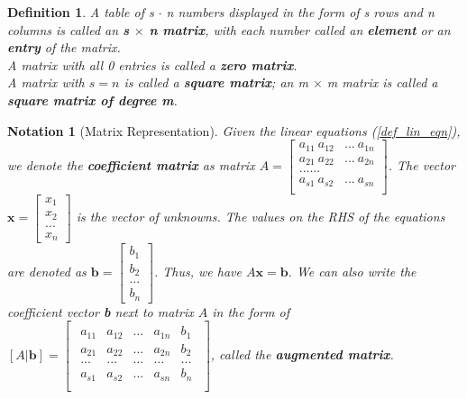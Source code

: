 \documentclass{article}
\newtheorem{definition}{Definition}[section] %
\newtheorem{notation}{Notation}[section] %
\begin{document}
\begin{definition}
    A table of s $\cdot$ n numbers displayed in the form of s rows and n columns is called an \textbf{s $\times$ n matrix}, with each number called an \textbf{element} or an \textbf{entry} of the matrix. \\
    A matrix with all 0 entries is called a \textbf{zero matrix}. \\
    A matrix with $s=n$ is called a \textbf{square matrix}; an m $\times$ m matrix is called a \textbf{square matrix of degree m}.
\end{definition}

\begin{notation}[Matrix Representation]
    Given the linear equations (\ref{def_lin_eqn}), we denote the \textbf{coefficient matrix} as matrix
    $A = \begin{bmatrix}
        a_{11} \ a_{12} & ... \ a_{1n} \\
        a_{21} \ a_{22} & ... \ a_{2n} \\
        ...... \\
        a_{s1} \ a_{s2} & ... \ a_{sn} \\
    \end{bmatrix}$. The vector $\textbf{x}=\begin{bmatrix}x_1 \\ x_2 \\ ... \\ x_n \end{bmatrix}$ is the vector of unknowns. The values on the RHS of the equations are denoted as $\textbf{b}=\begin{bmatrix}b_1 \\ b_2 \\ ... \\ b_n \end{bmatrix}$. Thus, we have $A\textbf{x}=\textbf{b}$.
    We can also write the coefficient vector \textbf{b} next to matrix $A$ in the form of $[A | \textbf{b}]=\begin{bmatrix}
    \begin{array}{cccc|c}
        a_{11} & a_{12} & ... & a_{1n} & b_1\\
        a_{21} & a_{22} & ... & a_{2n} & b_2\\
        ... & ... & ... & ... & ... \\
        a_{s1} & a_{s2} & ... & a_{sn} & b_n \\
    \end{array}
    \end{bmatrix}$, called the \textbf{augmented matrix}.
\end{notation}
\end{document}
